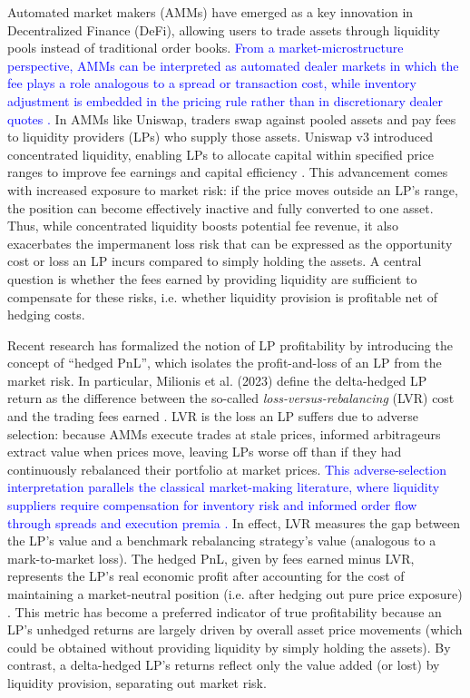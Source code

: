 \documentclass[11pt]{article}
\begin{document}
Automated market makers (AMMs) have emerged as a key innovation in Decentralized Finance (DeFi), allowing users to trade assets 
through liquidity pools instead of traditional order books. \textcolor{blue}{From a market-microstructure perspective, AMMs can be interpreted
as automated dealer markets in which the fee plays a role analogous to a spread or transaction cost, while inventory adjustment
is embedded in the pricing rule rather than in discretionary dealer quotes \cite{ho1983,avellaneda2008,angeris2020,cartea2022execution}.}
In AMMs like Uniswap, traders swap against pooled assets and pay fees to liquidity providers (LPs) who supply those assets.
Uniswap v3 introduced concentrated liquidity, enabling LPs
to allocate capital within specified price ranges to improve fee earnings and capital efficiency \cite{adams2021}. This 
advancement comes with increased exposure to market risk: if the price moves outside an LP’s range, the position can 
become effectively inactive and fully converted to one asset. Thus, while concentrated liquidity boosts potential fee 
revenue, it also exacerbates the impermanent loss risk that can be expressed as the opportunity cost or loss an LP 
incurs compared to simply holding the assets. A central question is whether the fees earned by providing liquidity 
are sufficient to compensate for these risks, i.e. whether liquidity provision is profitable net of hedging costs.

Recent research \cite{milionis2023} has formalized the notion of LP profitability by introducing the concept of “hedged 
PnL”, which isolates the profit-and-loss of an LP from the market risk. In particular, Milionis et al. (2023) define the 
delta-hedged LP return as the difference between the so-called \textit{loss-versus-rebalancing} (LVR) cost and the trading 
fees earned \cite{milionis2023}. LVR is the loss an LP suffers due to adverse selection: because AMMs execute trades at 
stale prices, informed arbitrageurs extract value when prices move, leaving LPs worse off than if they had continuously 
rebalanced their portfolio at market prices. \textcolor{blue}{This adverse-selection interpretation parallels the classical market-making
literature, where liquidity suppliers require compensation for inventory risk and informed order flow through spreads and
execution premia \cite{ho1983,avellaneda2008,cartea2015book,gueant2016book}.} In effect, LVR measures the gap between the LP’s value and a benchmark
rebalancing strategy’s value (analogous to a mark-to-market loss). The hedged PnL, given by fees earned minus LVR, 
represents the LP’s real economic profit after accounting for the cost of maintaining a market-neutral position (i.e. 
after hedging out pure price exposure) \cite{milionis2023}. This metric has become a preferred indicator of true 
profitability because an LP’s unhedged returns are largely driven by overall asset price movements (which could be 
obtained without providing liquidity by simply holding the assets). By contrast, a delta-hedged LP’s returns reflect 
only the value added (or lost) by liquidity provision, separating out market risk.
\end{document}
